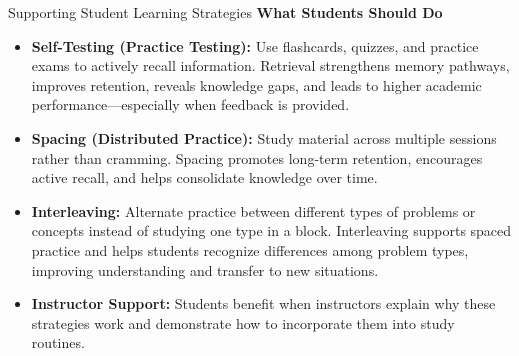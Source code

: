 \documentclass[dvipsnames]{beamer}
\begin{document}
\begin{frame}{Supporting Student Learning Strategies}
\textbf{What Students Should Do}

\begin{itemize}
\item \textbf{Self-Testing (Practice Testing):}  
Use flashcards, quizzes, and practice exams to actively recall information. Retrieval strengthens memory pathways, improves retention, reveals knowledge gaps, and leads to higher academic performance—especially when feedback is provided.
\end{itemize}
\end{frame}
\begin{frame}
    
\begin{itemize}
\item \textbf{Spacing (Distributed Practice):}  
Study material across multiple sessions rather than cramming. Spacing promotes long-term retention, encourages active recall, and helps consolidate knowledge over time.

\item \textbf{Interleaving:}  
Alternate practice between different types of problems or concepts instead of studying one type in a block. Interleaving supports spaced practice and helps students recognize differences among problem types, improving understanding and transfer to new situations.

\item \textbf{Instructor Support:}  
Students benefit when instructors explain why these strategies work and demonstrate how to incorporate them into study routines.
\end{itemize}

\end{frame}
\end{document}
